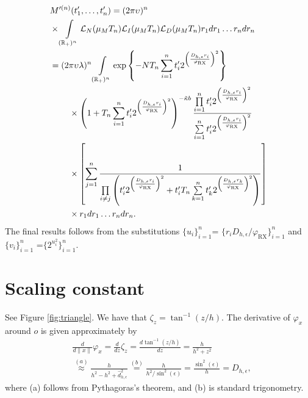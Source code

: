 \documentclass[lettersize,journal]{IEEEtran}
\newcommand{\R}{\mathbb{R}}
\begin{document}
\begin{align}
  &M'^{(n)}(t'_1,\dots,t'_n) =(2 \pi \upsilon_{})^n\nonumber\\
  & \times\int\limits_{(\R_+)^n} \mathcal{L}_N(\mu_MT_n)\mathcal{L}_I(\mu_MT_n)\mathcal{L}_D(\mu_MT_n) r_1 dr_1 \dots r_n dr_n\nonumber \\
  &=(2 \pi \upsilon_{} \lambda)^n \int\limits_{(\R_+)^n} \exp\left\{-NT_n\sum\limits_{i=1}^nt'_i2^{\left(\frac{D_{h,\epsilon}r_i}{\varphi_{\text{RX}}}\right)^2}\right\} \nonumber\\
  &\hspace{0.8cm}\times\left(1+T_n\sum\limits_{i=1}^nt'_i2^{\left(\frac{D_{h,\epsilon}r_i}{\varphi_{\text{RX}}}\right)^2}\right)^{- \tilde{\kappa}b} \frac{\prod\limits_{i=1}^nt'_i2^{\left(\frac{D_{h,\epsilon}r_i}{\varphi_{\text{RX}}}\right)^2}}{\sum\limits_{i=1}^nt'_i2^{\left(\frac{D_{h,\epsilon}r_i}{\varphi_{\text{RX}}}\right)^2}} \nonumber\\
  &\hspace{0.8cm}\times  \left[\sum\limits_{j=1}^n\frac{1}{\prod\limits_{i\neq j}\left(t'_i 2^{\left(\frac{D_{h,\epsilon}r_i}{\varphi_{\text{RX}}}\right)^2}+ t_i'T_n\sum\limits_{k=1}^nt'_k2^{\left(\frac{D_{h,\epsilon}r_k}{\varphi_{\text{RX}}}\right)^2} \right)} \right] \nonumber\\
  &\hspace{0.8cm}\times r_1 dr_1 \dots r_n dr_n.
\end{align}
The final results follows from the substitutions $\{u_i\}_{i= 1}^n$= $\{r_i D_{h,\epsilon}/\varphi_{\text{RX}}\}_{i= 1}^n$ and $\{v_i\}_{i= 1}^n$ =$\{ 2^{u^2_i}\}_{i= 1}^n$.



\section{Scaling constant}


\label{app:constantD}
See Figure \ref{fig:triangle}. We have that $\zeta_{z}= \tan^{-1}(z/h)$. The derivative of $\varphi_x$  around $\textit{o}$ is given approximately by
\begin{align}
  &\frac{d}{d \| x\|}\varphi_{x} =\frac{d}{dz}\zeta_{z}  = \frac{d\tan^{-1}(z/h)}{dz} = \frac{h}{h^2 + z^2}   \nonumber\\
  &\overset{(a)}{\approx} \frac{h}{h^2 -h^2 + \hat{d}^2_{h,\epsilon}}  \overset{(b)}{=}\frac{h}{ h^2/\sin^2(\epsilon)} = \frac{\sin^2(\epsilon)}{h} = D_{h,\epsilon},
\end{align}
where (a) follows from Pythagoras's theorem, and (b) is standard trigonometry.
\end{document}
